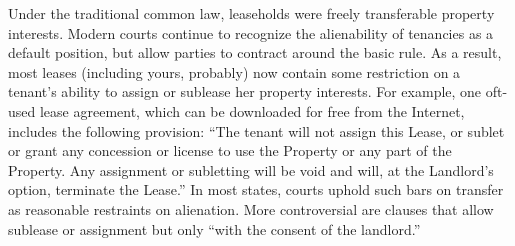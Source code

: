 Under the traditional common law, leaseholds were freely transferable property
interests.  Modern courts continue to recognize the alienability of tenancies
as a default position, but allow parties to contract around the basic rule.  As
a result, most leases (including yours, probably) now contain some restriction
on a tenant's ability to assign or sublease her property interests.  For
example, one oft-used lease agreement, which can be downloaded for free from
the Internet, includes the following provision: ``The tenant will not assign
this Lease, or sublet or grant any concession or license to use the Property or
any part of the Property.  Any assignment or subletting will be void and will,
at the Landlord's option, terminate the Lease.''  In most states, courts uphold
such bars on transfer as reasonable restraints on alienation. More
controversial are clauses that allow sublease or assignment but only ``with the
consent of the landlord.''


